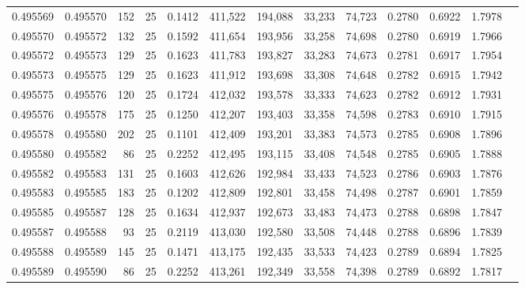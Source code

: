 \begin{tabular}{rrrrrrrrrrrrr}
0.495569 & 0.495570 &   152 &  25 &                                     0.1412 & 411,522 & 194,088 &  33,233 &  74,723 & 0.2780 & 0.6922 & 1.7978 \\
0.495570 & 0.495572 &   132 &  25 &                                     0.1592 & 411,654 & 193,956 &  33,258 &  74,698 & 0.2780 & 0.6919 & 1.7966 \\
0.495572 & 0.495573 &   129 &  25 &                                     0.1623 & 411,783 & 193,827 &  33,283 &  74,673 & 0.2781 & 0.6917 & 1.7954 \\
0.495573 & 0.495575 &   129 &  25 &                                     0.1623 & 411,912 & 193,698 &  33,308 &  74,648 & 0.2782 & 0.6915 & 1.7942 \\
0.495575 & 0.495576 &   120 &  25 &                                     0.1724 & 412,032 & 193,578 &  33,333 &  74,623 & 0.2782 & 0.6912 & 1.7931 \\
0.495576 & 0.495578 &   175 &  25 &                                     0.1250 & 412,207 & 193,403 &  33,358 &  74,598 & 0.2783 & 0.6910 & 1.7915 \\
0.495578 & 0.495580 &   202 &  25 &                                     0.1101 & 412,409 & 193,201 &  33,383 &  74,573 & 0.2785 & 0.6908 & 1.7896 \\
0.495580 & 0.495582 &    86 &  25 &                                     0.2252 & 412,495 & 193,115 &  33,408 &  74,548 & 0.2785 & 0.6905 & 1.7888 \\
0.495582 & 0.495583 &   131 &  25 &                                     0.1603 & 412,626 & 192,984 &  33,433 &  74,523 & 0.2786 & 0.6903 & 1.7876 \\
0.495583 & 0.495585 &   183 &  25 &                                     0.1202 & 412,809 & 192,801 &  33,458 &  74,498 & 0.2787 & 0.6901 & 1.7859 \\
0.495585 & 0.495587 &   128 &  25 &                                     0.1634 & 412,937 & 192,673 &  33,483 &  74,473 & 0.2788 & 0.6898 & 1.7847 \\
0.495587 & 0.495588 &    93 &  25 &                                     0.2119 & 413,030 & 192,580 &  33,508 &  74,448 & 0.2788 & 0.6896 & 1.7839 \\
0.495588 & 0.495589 &   145 &  25 &                                     0.1471 & 413,175 & 192,435 &  33,533 &  74,423 & 0.2789 & 0.6894 & 1.7825 \\
0.495589 & 0.495590 &    86 &  25 &                                     0.2252 & 413,261 & 192,349 &  33,558 &  74,398 & 0.2789 & 0.6892 & 1.7817 \\

\end{tabular}
